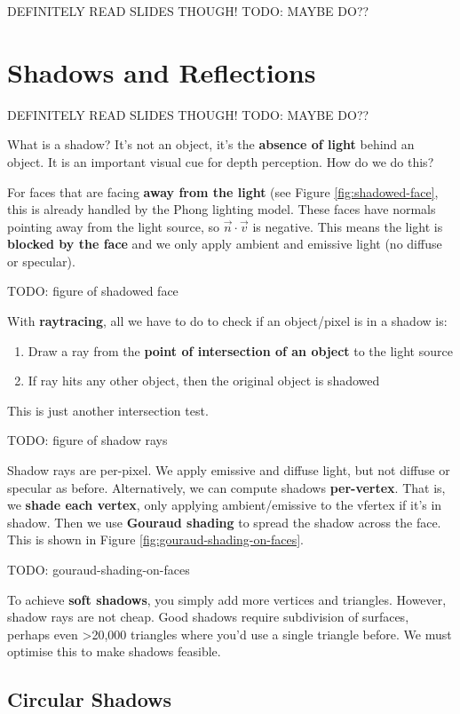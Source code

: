 \documentclass{article}
\begin{document}
DEFINITELY READ SLIDES THOUGH!
TODO: MAYBE DO??

\section{Shadows and Reflections}

DEFINITELY READ SLIDES THOUGH!
TODO: MAYBE DO??

What is a shadow? It's not an object, it's the \textbf{absence of light} behind an object. It is an important visual cue for depth perception. How do we do this?

For faces that are facing \textbf{away from the light} (see Figure \ref{fig:shadowed-face}, this is already handled by the Phong lighting model. These faces have normals pointing away from the light source, so $\vec{n} \cdot \vec{v}$ is negative. This means the light is \textbf{blocked by the face} and we only apply ambient and emissive light (no diffuse or specular).

TODO: figure of shadowed face

With \textbf{raytracing}, all we have to do to check if an object/pixel is in a shadow is:
\begin{enumerate}
	\item Draw a ray from the \textbf{point of intersection of an object} to the light source
	\item If ray hits any other object, then the original object is shadowed
\end{enumerate}
This is just another intersection test.

TODO: figure of shadow rays

Shadow rays are per-pixel. We apply emissive and diffuse light, but not diffuse or specular as before. Alternatively, we can compute shadows \textbf{per-vertex}. That is, we \textbf{shade each vertex}, only applying ambient/emissive to the vfertex if it's in shadow. Then we use \textbf{Gouraud shading} to spread the shadow across the face. This is shown in Figure \ref{fig:gouraud-shading-on-faces}.

TODO: gouraud-shading-on-faces

To achieve \textbf{soft shadows}, you simply add more vertices and triangles. However, shadow rays are not cheap. Good shadows require subdivision of surfaces, perhaps even >20,000 triangles where you'd use a single triangle before. We must optimise this to make shadows feasible.

\subsection{Circular Shadows}
\end{document}

